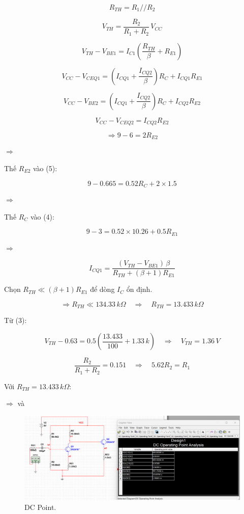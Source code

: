 	\[
	R_{TH} = R_1 // R_2 \tag{1}
	\]
	
	\[
	V_{TH} = \frac{R_2}{R_1 + R_2} \, V_{CC} \tag{2}
	\]
	
	\[
	V_{TH} - V_{BE1} = I_{C1} \left( \frac{R_{TH}}{\beta} + R_{E1} \right) \tag{3}
	\]
	
	\[
	V_{CC} - V_{CEQ1} = (I_{CQ1} + \frac{I_{CQ2}}{\beta}) R_C + I_{CQ1} R_{E1} \tag{4}
	\]
	
	\[
	V_{CC} - V_{BE2} = (I_{CQ1} + \frac{I_{CQ2}}{\beta}) R_C + I_{CQ2} R_{E2} \tag{5}
	\]
	
	\[
	V_{CC} - V_{CEQ2} = I_{CQ2} R_{E2} \tag{6}
	\]
	
	\[
	\Rightarrow 9 - 6 = 2 R_{E2}
	\]
	
	$\Rightarrow$ 
	
	Thế \( R_{E2} \) vào (5):
	
	\[
	9 - 0.665 = 0.52 R_C + 2 \times 1.5 
	\]
	
	$\Rightarrow$ 
	
	Thế \( R_C \) vào (4):
	
	\[
	9 - 3 = 0.52 \times 10.26 + 0.5 R_{E1}
	\]
	
	$\Rightarrow$ 
	
	\[
	I_{CQ1} = \frac{(V_{TH} - V_{BE1}) \, \beta}{R_{TH} + (\beta + 1) R_{E1}} \tag{7}
	\]
	
	Chọn \( R_{TH} \ll (\beta + 1) R_{E1} \) để dòng \( I_C \) ổn định.
	
	\[
	\Rightarrow R_{TH} \ll 134.33\,k\Omega 
	\quad \Rightarrow \quad R_{TH} = 13.433\,k\Omega
	\]
	
	Từ (3):
	
	\[
	V_{TH} - 0.63 = 0.5 \left( \frac{13.433}{100} + 1.33\,k \right)
	\quad \Rightarrow \quad V_{TH} = 1.36\,V
	\]
	
	\[
	\frac{R_2}{R_1 + R_2} = 0.151 
	\quad \Rightarrow \quad 5.62 R_2 = R_1
	\]
	
	Với \( R_{TH} = 13.433\,k\Omega \):
	
	$\Rightarrow$  và 
	
	\begin{figure}[H]
		\centering
		\includegraphics[width=.8\linewidth]{./my-chapters/my-images/Question9/a_diem_q.png}
		\caption{DC Point.}
	\end{figure}
	
